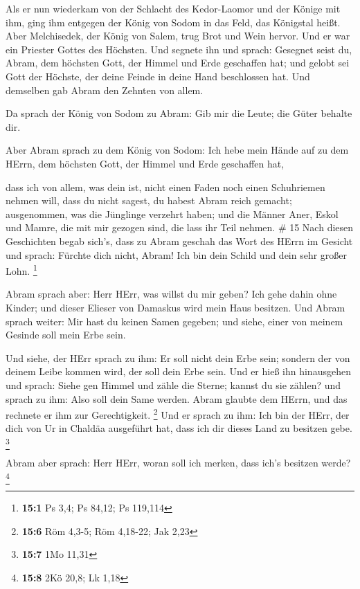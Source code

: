  Als er nun wiederkam von der Schlacht des Kedor-Laomor und
der Könige mit ihm, ging ihm entgegen der König von Sodom in das Feld,
das Königstal heißt.  Aber Melchisedek, der König von
Salem, trug Brot und Wein hervor. Und er war ein Priester Gottes des
Höchsten.  Und segnete ihn und sprach: Gesegnet seist du,
Abram, dem höchsten Gott, der Himmel und Erde geschaffen hat;
 und gelobt sei Gott der Höchste, der deine Feinde in deine
Hand beschlossen hat. Und demselben gab Abram den Zehnten von allem.

 Da sprach der König von Sodom zu Abram: Gib mir die Leute;
die Güter behalte dir.

 Aber Abram sprach zu dem König von Sodom: Ich hebe mein
Hände auf zu dem HErrn, dem höchsten Gott, der Himmel und Erde
geschaffen hat,

 dass ich von allem, was dein ist, nicht einen Faden noch
einen Schuhriemen nehmen will, dass du nicht sagest, du habest Abram
reich gemacht;  ausgenommen, was die Jünglinge verzehrt
haben; und die Männer Aner, Eskol und Mamre, die mit mir gezogen sind,
die lass ihr Teil nehmen. \# 15  Nach diesen Geschichten
begab sich's, dass zu Abram geschah das Wort des HErrn im Gesicht und
sprach: Fürchte dich nicht, Abram! Ich bin dein Schild und dein sehr
großer Lohn. \footnote{\textbf{15:1} Ps 3,4; Ps 84,12; Ps 119,114}

 Abram sprach aber: Herr HErr, was willst du mir geben? Ich
gehe dahin ohne Kinder; und dieser Elieser von Damaskus wird mein Haus
besitzen.  Und Abram sprach weiter: Mir hast du keinen Samen
gegeben; und siehe, einer von meinem Gesinde soll mein Erbe sein.

 Und siehe, der HErr sprach zu ihm: Er soll nicht dein Erbe
sein; sondern der von deinem Leibe kommen wird, der soll dein Erbe sein.
 Und er hieß ihn hinausgehen und sprach: Siehe gen Himmel
und zähle die Sterne; kannst du sie zählen? und sprach zu ihm: Also soll
dein Same werden.  Abram glaubte dem HErrn, und das rechnete
er ihm zur Gerechtigkeit. \footnote{\textbf{15:6} Röm 4,3-5; Röm
  4,18-22; Jak 2,23}  Und er sprach zu ihm: Ich bin der
HErr, der dich von Ur in Chaldäa ausgeführt hat, dass ich dir dieses
Land zu besitzen gebe. \footnote{\textbf{15:7} 1Mo 11,31}

 Abram aber sprach: Herr HErr, woran soll ich merken, dass
ich's besitzen werde? \footnote{\textbf{15:8} 2Kö 20,8; Lk 1,18}

